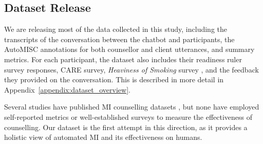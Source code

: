 \subsection{Dataset Release}
\label{dataset_release}
We are releasing most of the data collected in this study, including the transcripts of the conversation between the chatbot and participants, the Auto\-MISC annotations for both counsellor and client utterances, and summary metrics. For each participant, the dataset also includes their readiness ruler survey responses, CARE survey, \emph{Heaviness of Smoking} survey \citep{heatherton1989measuring}, and the feedback they provided on the conversation. This is described in more detail in Appendix~\ref{appendix:dataset_overview}.

Several studies have published MI counselling datasets \citep{perez-rosas-etal-2019-makes,welivita-pu-2022-curating,cohen-etal-2024-motivational,sun-etal-2024-eliciting,younsi-etal-2024-beyond}, but none have employed self-reported metrics or well-established surveys to measure the effectiveness of counselling. Our dataset is the first attempt in this direction, as it provides a holistic view of automated MI and its effectiveness on humans.